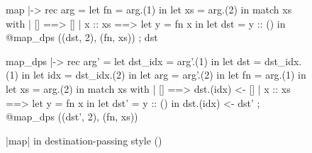 \begin{figure}[tp]
\begin{minipage}{.45\columnwidth}
\begin{Lambd}
map |-> rec arg =
  let fn = arg.(1) in
  let xs = arg.(2) in
  match xs with
  | [] ==> 
      []
  | x :: xs ==>
      let y = fn x in
      let dst = y :: () in
      @map_dps ((dst, 2), (fn, xs)) ;
      dst
\end{Lambd}
\end{minipage}
\hfill
\begin{minipage}{.45\columnwidth}
\begin{Lambd}
map_dps |-> rec arg' =
  let dst_idx = arg'.(1) in
  let dst = dst_idx.(1) in
  let idx = dst_idx.(2) in
  let arg = arg'.(2) in
  let fn = arg.(1) in
  let xs = arg.(2) in
  match xs with
  | [] ==> 
      dst.(idx) <- []
  | x :: xs ==>
      let y = fn x in
      let dst' = y :: () in
      dst.(idx) <- dst' ;
      @map_dps ((dst', 2), (fn, xs))
\end{Lambd}
\end{minipage}
\caption{\lambd|map| in destination-passing style (\LambdaLang)}
\label{fig:lambda_map_dps}
\end{figure}